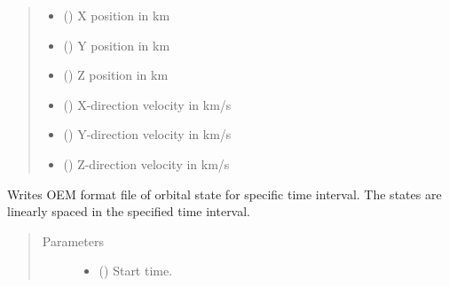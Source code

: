 \documentclass[letterpaper,10pt,english]{sphinxmanual}
\begin{document}
\begin{fulllineitems}
\begin{fulllineitems}
\begin{quote}
\begin{description}
\begin{itemize}
\item {} 
 () \textendash{} X position in km

\item {} 
 () \textendash{} Y position in km

\item {} 
 () \textendash{} Z position in km

\item {} 
 () \textendash{} X-direction velocity in km/s

\item {} 
 () \textendash{} Y-direction velocity in km/s

\item {} 
 () \textendash{} Z-direction velocity in km/s

\end{itemize}

\end{description}\end{quote}

\end{fulllineitems}


\begin{fulllineitems}
\label{\detokenize{modules/space_object:space_object.SpaceObject.write_oem}}
Writes OEM format file of orbital state for specific time interval.
The states are linearly spaced in the specified time interval.
\begin{quote}\begin{description}
\item[{Parameters}] \leavevmode\begin{itemize}
\item {} 
 () \textendash{} Start time.


\end{itemize}
\end{description}
\end{quote}
\end{fulllineitems}
\end{fulllineitems}
\end{document}
